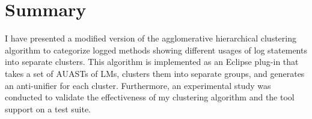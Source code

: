 
\section{Summary} \label{meth2-summary}
I have presented a modified version of the agglomerative hierarchical clustering algorithm to categorize logged methods showing different usages of log statements into separate clusters. This algorithm is implemented as an Eclipse plug-in that takes a set of AUASTs of LMs, clusters them into separate groups, and generates an anti-unifier for each cluster. Furthermore, an experimental study was conducted to validate the effectiveness of my clustering algorithm and the tool support on a test suite.




